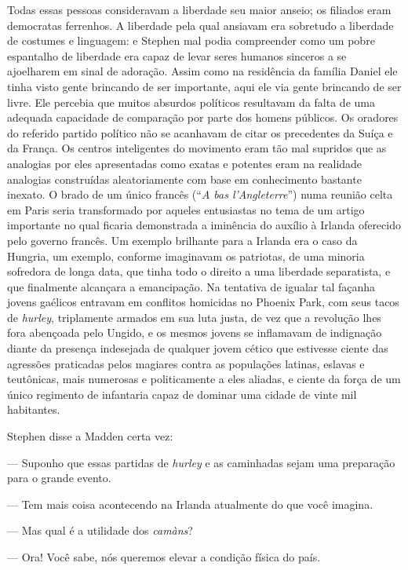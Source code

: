 Todas essas pessoas consideravam a liberdade seu maior anseio; os
filiados eram democratas ferrenhos.  A liberdade pela qual ansiavam era
sobretudo a liberdade de costumes e linguagem: e Stephen mal podia
compreender como um pobre espantalho de liberdade era capaz de levar
seres humanos sinceros a se ajoelharem em sinal de adoração.  Assim
como na residência da família Daniel ele tinha visto gente brincando de
ser importante, aqui ele via gente brincando de ser livre.  Ele percebia
que muitos absurdos políticos resultavam da falta de uma adequada
capacidade de comparação por parte dos homens públicos.  Os oradores do
referido partido político não se acanhavam de citar os precedentes da
Suíça e da França.  Os centros inteligentes do movimento eram tão mal
supridos que as analogias por eles apresentadas como exatas e potentes
eram na realidade analogias construídas aleatoriamente com base em
conhecimento bastante inexato.  O brado de um único francês (“\textit{A
bas l’Angleterre}”) numa reunião celta em Paris seria transformado por
aqueles entusiastas no tema de um artigo importante no qual ficaria
demonstrada a iminência do auxílio à Irlanda oferecido pelo governo
francês.  Um exemplo brilhante para a Irlanda era o caso da Hungria, um
exemplo, conforme imaginavam os patriotas, de uma minoria sofredora de
longa data, que tinha todo o direito a uma liberdade separatista, e que
finalmente alcançara a emancipação.  Na tentativa de igualar tal
façanha jovens gaélicos entravam em conflitos homicidas no Phoenix
Park, com seus tacos de \textit{hurley}, triplamente armados em sua
luta justa, de vez que a revolução lhes fora abençoada pelo Ungido, e
os mesmos jovens se inflamavam de indignação diante da presença
indesejada de qualquer jovem cético que estivesse ciente das agressões
praticadas pelos magiares contra as populações latinas, eslavas e
teutônicas, mais numerosas e politicamente a eles aliadas, e ciente da
força de um único regimento de infantaria capaz de dominar uma cidade
de vinte mil habitantes.

Stephen disse a Madden certa vez:

--- Suponho que essas partidas de \textit{hurley} e as caminhadas
sejam uma preparação para o grande evento.

--- Tem mais coisa acontecendo na Irlanda atualmente do que você
imagina.

--- Mas qual é a utilidade dos \textit{camàns}?

--- Ora!  Você sabe, nós queremos elevar a condição física do
país.

